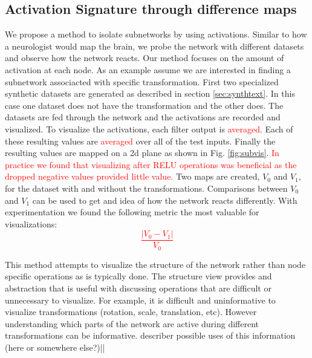 \documentclass[10pt,twocolumn,letterpaper]{article}
\begin{document}
\subsection{Activation Signature through difference maps} \label{sec:subnetwork}
We propose a method to isolate subnetworks by using activations. Similar to how a neurologist would map the brain, we probe the network with different datasets and observe how the network reacts. Our method focuses on the amount of activation at each node. As an example assume we are interested in finding a subnetwork associacted with specific transformation. First two specialized synthetic datasets are generated as described in section \ref{sec:synthtext}. In this case one dataset does not have the transformation and the other does. The datasets are fed through the network and the activations are recorded and visualized. To visualize the activations, each filter output is \textcolor{red}{averaged}. Each of these resulting values are \textcolor{red}{averaged} over all of the test inputs. Finally the resulting values are mapped on a 2d plane as shown in Fig. \ref{fig:subvis}. \textcolor{red}{In practice we found that visualizing after RELU operations was beneficial as the dropped negative values provided little value.} Two maps are created, $V_0$ and $V_1$, for the dataset with and without the transformations. Comparisons between $V_0$ and $V_1$ can be used to get and idea of how the network reacts differently. With experimentation we found the following metric the most valuable for visualizations: \textcolor{red}{$$\frac{|V_0-V_1|}{V_0}$$}

This method attempts to visualize the structure of the network rather than node specific operations as is typically done. The structure view provides and abstraction that is useful with discussing operations that are difficult or unnecessary to visualize. For example, it is difficult and uninformative to visualize transformations (rotation, scale, translation, etc). However understanding which parts of the network are active during different transformations can be informative.
describer possible uses of this information (here or somewhere else?)||
\end{document}
